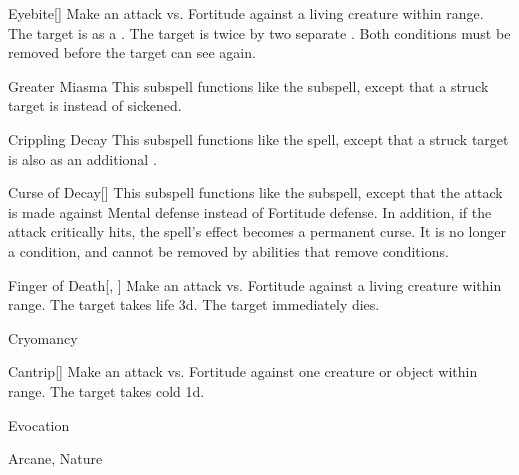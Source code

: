 \begin{ability}[\nth{3}]{Eyebite}[]
Make an attack vs. Fortitude against a living creature within \rngclose range.
\hit The target is  as a .
\crit The target is  twice by two separate .
Both conditions must be removed before the target can see again.
\end{ability}
\vspace{0.25em}


\begin{ability}[\nth{3}]{Greater Miasma}
This subspell functions like the  subspell, except that a struck target is  instead of sickened.
\end{ability}
\vspace{0.25em}


\begin{ability}[\nth{4}]{Crippling Decay}
This subspell functions like the  spell, except that a struck target is also  as an additional .
\end{ability}
\vspace{0.25em}


\begin{ability}[\nth{4}]{Curse of Decay}[]
This subspell functions like the  subspell, except that the attack is made against Mental defense instead of Fortitude defense.
In addition, if the attack critically hits, the spell's effect becomes a permanent curse.
It is no longer a condition, and cannot be removed by abilities that remove conditions.
\end{ability}
\vspace{0.25em}


\begin{ability}[\nth{5}]{Finger of Death}[, ]
Make an attack vs. Fortitude against a living creature within \rngclose range.
\hit The target takes life  \plus3d.
\crit The target immediately dies.
\end{ability}
\vspace{0.25em}

\newpage
\begin{spellsection}{Cryomancy}

\begin{spellheader}
\end{spellheader}


\begin{ability}{Cantrip}[]
Make an attack vs. Fortitude against one creature or object within \rngmed range.
\hit The target takes cold  \minus1d.
\end{ability}




 Evocation

 Arcane, Nature
\end{spellsection}


